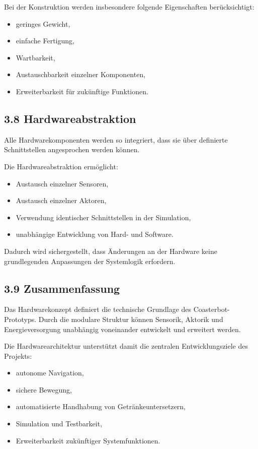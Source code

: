 \documentclass[
]{article}
\providecommand{\tightlist}{%
  \setlength{\itemsep}{0pt}\setlength{\parskip}{0pt}}
\begin{document}
Bei der Konstruktion werden insbesondere folgende Eigenschaften
berücksichtigt:

\begin{itemize}
\tightlist
\item
  geringes Gewicht,
\item
  einfache Fertigung,
\item
  Wartbarkeit,
\item
  Austauschbarkeit einzelner Komponenten,
\item
  Erweiterbarkeit für zukünftige Funktionen.
\end{itemize}

\subsection{3.8 Hardwareabstraktion}\label{hardwareabstraktion}

Alle Hardwarekomponenten werden so integriert, dass sie über definierte
Schnittstellen angesprochen werden können.

Die Hardwareabstraktion ermöglicht:

\begin{itemize}
\tightlist
\item
  Austausch einzelner Sensoren,
\item
  Austausch einzelner Aktoren,
\item
  Verwendung identischer Schnittstellen in der Simulation,
\item
  unabhängige Entwicklung von Hard- und Software.
\end{itemize}

Dadurch wird sichergestellt, dass Änderungen an der Hardware keine
grundlegenden Anpassungen der Systemlogik erfordern.

\subsection{3.9 Zusammenfassung}\label{zusammenfassung-1}

Das Hardwarekonzept definiert die technische Grundlage des
Coasterbot-Prototyps. Durch die modulare Struktur können Sensorik,
Aktorik und Energieversorgung unabhängig voneinander entwickelt und
erweitert werden.

Die Hardwarearchitektur unterstützt damit die zentralen
Entwicklungsziele des Projekts:

\begin{itemize}
\tightlist
\item
  autonome Navigation,
\item
  sichere Bewegung,
\item
  automatisierte Handhabung von Getränkeuntersetzern,
\item
  Simulation und Testbarkeit,
\item
  Erweiterbarkeit zukünftiger Systemfunktionen.
\end{itemize}
\end{document}
